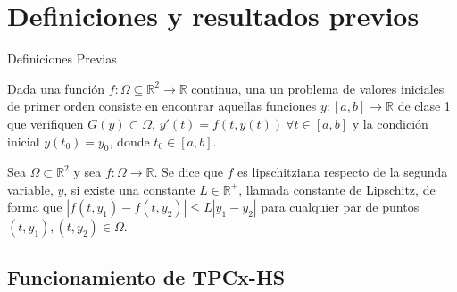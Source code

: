 \section{Definiciones y resultados previos}
		\begin{frame}{Definiciones Previas}
			\begin{definition} 
				Dada una función $f:\Omega \subseteq \mathbb R^2  \to \mathbb{R}$ continua, una un problema de valores iniciales de primer orden consiste en encontrar aquellas funciones $y: [a,b] \rightarrow \mathbb{R}$ de clase 1 que verifiquen $G(y) \subset \Omega$, $y'(t) = f(t,y(t)) \ \forall t \in [a,b]$ y la condición inicial $y(t_0) = y_0$, donde $t_0 \in [a,b]$.  
			\end{definition}
		
			\begin{definition}
				Sea $\Omega \subset \mathbb{R}^2$ y sea $f : \Omega \rightarrow \mathbb{R}$. Se dice que $f$ es lipschitziana respecto de la segunda variable, $y$, si existe una constante $L \in \mathbb{R^{+}}$, llamada constante de Lipschitz, de forma que $|f(t,y_1) - f(t, y_2)| \le L|y_1 - y_2|$ para cualquier par de puntos $(t,y_1), (t,y_2) \in \Omega$.  
			\end{definition}
		\end{frame}
	
	\subsection*{Funcionamiento de TPCx-HS}	

